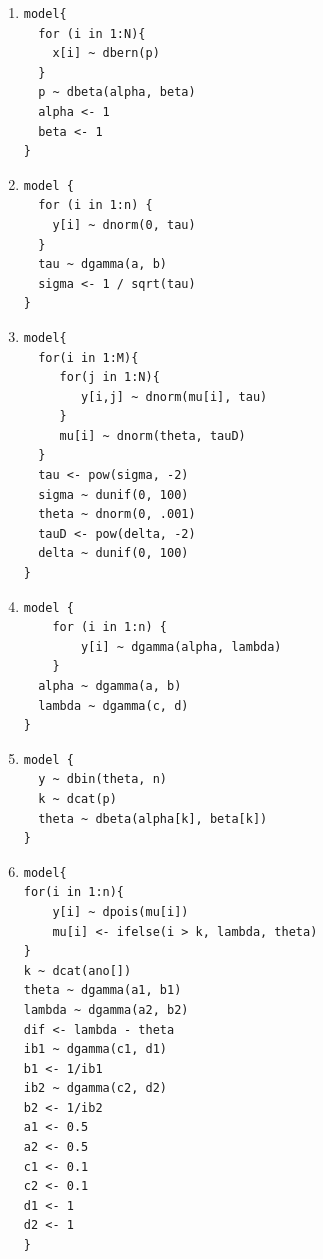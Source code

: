 \documentclass[11pt,a4]{article}\usepackage[]{graphicx}\usepackage[]{xcolor}
\begin{document}
\begin{enumerate}
\begin{enumerate}
  \item
\begin{verbatim}
model{
  for (i in 1:N){
    x[i] ~ dbern(p)
  }
  p ~ dbeta(alpha, beta)
  alpha <- 1
  beta <- 1
}
\end{verbatim}

  \item
\begin{verbatim}
model {
  for (i in 1:n) {
    y[i] ~ dnorm(0, tau)
  }
  tau ~ dgamma(a, b) 
  sigma <- 1 / sqrt(tau)
}
\end{verbatim}

\item
\begin{verbatim}
model{
  for(i in 1:M){
     for(j in 1:N){
        y[i,j] ~ dnorm(mu[i], tau)
     }
     mu[i] ~ dnorm(theta, tauD)
  }
  tau <- pow(sigma, -2)
  sigma ~ dunif(0, 100)
  theta ~ dnorm(0, .001)
  tauD <- pow(delta, -2)
  delta ~ dunif(0, 100)
}
\end{verbatim}

\item
\begin{verbatim}
model {
    for (i in 1:n) {
        y[i] ~ dgamma(alpha, lambda)
    }
  alpha ~ dgamma(a, b)
  lambda ~ dgamma(c, d)
}

\end{verbatim}

\item
\begin{verbatim}
model {
  y ~ dbin(theta, n)
  k ~ dcat(p)
  theta ~ dbeta(alpha[k], beta[k])
}
\end{verbatim}

\item
\begin{verbatim}
model{
for(i in 1:n){
    y[i] ~ dpois(mu[i])
    mu[i] <- ifelse(i > k, lambda, theta)
}
k ~ dcat(ano[])
theta ~ dgamma(a1, b1)
lambda ~ dgamma(a2, b2)
dif <- lambda - theta
ib1 ~ dgamma(c1, d1)
b1 <- 1/ib1
ib2 ~ dgamma(c2, d2)
b2 <- 1/ib2
a1 <- 0.5
a2 <- 0.5
c1 <- 0.1
c2 <- 0.1
d1 <- 1
d2 <- 1
}
\end{verbatim}
\end{enumerate}



\end{enumerate}
\end{document}
